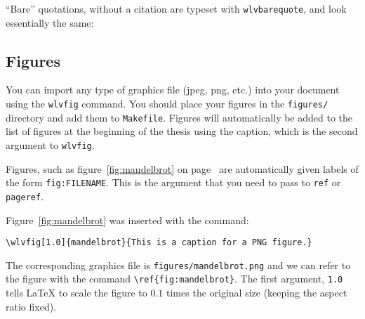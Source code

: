 
``Bare'' quotations, without a citation are typeset with
\verb!wlvbarequote!, and look essentially the same:



\subsection{Figures}


You can import any type of graphics file (jpeg, png, etc.) into your
document using the \verb!wlvfig! command. You should place your
figures in the \verb!figures/! directory and add them to
\verb!Makefile!. Figures will automatically be added to the list of
figures at the beginning of the thesis using the caption, which is the
second argument to \verb!wlvfig!.


Figures, such as figure~\ref{fig:mandelbrot} on 
page~\pageref{fig:mandelbrot} are automatically given labels of the form
\verb!fig:FILENAME!. This is the argument that you need to pass to
\verb!ref! or \verb!pageref!. 


Figure~\ref{fig:mandelbrot} was inserted with the command:
\begin{verbatim}
\wlvfig[1.0]{mandelbrot}{This is a caption for a PNG figure.}
\end{verbatim}

The corresponding graphics file is \verb!figures/mandelbrot.png! and
we can refer to the figure with the command
\verb!\ref{fig:mandelbrot}!. The first argument, \verb!1.0! tells
\LaTeX{} to scale the figure to $0.1$ times the original size (keeping
the aspect ratio fixed).

